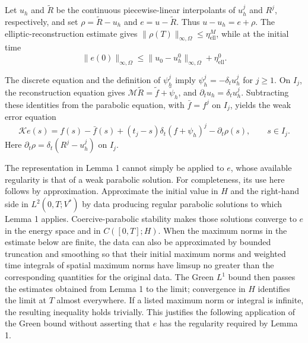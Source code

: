 \documentclass[11pt]{article}
\begin{document}
Let \(u_h\) and \(\widetilde R\) be the continuous piecewise-linear interpolants of \(u_h^j\) and \(R^j\), respectively, and set \(\rho=\widetilde R-u_h\) and \(e=u-\widetilde R\). Thus \(u-u_h=e+\rho\). The elliptic-reconstruction estimate gives \(\|\rho(T)\|_{\infty,\Omega}\leq\eta_{\mathrm{ell}}^M\), while at the initial time
\[
\|e(0)\|_{\infty,\Omega}\leq\|u_0-u_h^0\|_{\infty,\Omega}+\eta_{\mathrm{ell}}^0.
\]

The discrete equation and the definition of \(\psi_h^j\) imply \(\psi_h^j=-\delta_tu_h^j\) for \(j\geq1\). On \(I_j\), the reconstruction equation gives \(\mathcal M\widetilde R=\widetilde f+\widetilde\psi_h\), and \(\partial_tu_h=\delta_tu_h^j\). Subtracting these identities from the parabolic equation, with \(\bar f=f^j\) on \(I_j\), yields the weak error equation
\[
\mathcal K e(s)=f(s)-\bar f(s)+(t_j-s)\delta_t(f+\psi_h)^j-\partial_t\rho(s),\qquad s\in I_j.
\]
Here \(\partial_t\rho=\delta_t(R^j-u_h^j)\) on \(I_j\).

The representation in Lemma 1 cannot simply be applied to \(e\), whose available regularity is that of a weak parabolic solution. For completeness, its use here follows by approximation. Approximate the initial value in \(H\) and the right-hand side in \(L^2(0,T;V^*)\) by data producing regular parabolic solutions to which Lemma 1 applies. Coercive-parabolic stability makes those solutions converge to \(e\) in the energy space and in \(C([0,T];H)\). When the maximum norms in the estimate below are finite, the data can also be approximated by bounded truncation and smoothing so that their initial maximum norms and weighted time integrals of spatial maximum norms have limsup no greater than the corresponding quantities for the original data. The Green \(L^1\) bound then passes the estimates obtained from Lemma 1 to the limit; convergence in \(H\) identifies the limit at \(T\) almost everywhere. If a listed maximum norm or integral is infinite, the resulting inequality holds trivially. This justifies the following application of the Green bound without asserting that \(e\) has the regularity required by Lemma 1.
\end{document}
